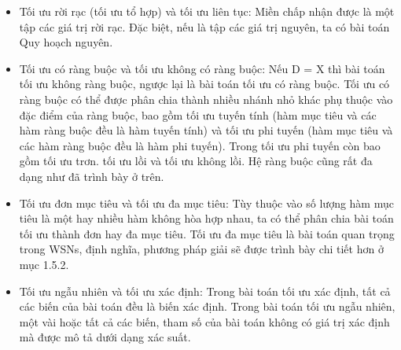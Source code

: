 \documentclass{article}
\begin{document}
\begin{itemize}
    \item Tối ưu rời rạc (tối ưu tổ hợp)  và tối ưu liên tục: Miền chấp nhận được là một tập các giá trị rời rạc. Đặc biệt, nếu là tập các giá trị nguyên, ta có bài toán Quy hoạch nguyên.
    \item Tối ưu có ràng buộc và tối ưu không có ràng buộc: Nếu D = X thì bài toán tối ưu không ràng buộc, ngược lại là bài toán tối ưu có ràng buộc. Tối ưu có ràng buộc có thể được phân chia thành nhiều nhánh nhỏ khác phụ thuộc vào đặc điểm của ràng buộc, bao gồm tối ưu tuyến tính (hàm mục tiêu và  các hàm ràng buộc đều là hàm tuyến tính) và tối ưu phi tuyến  (hàm mục tiêu và  các hàm ràng buộc đều là hàm phi tuyến). Trong tối ưu phi tuyến còn bao gồm tối ưu trơn. tối ưu lồi và tối ưu không lồi. Hệ ràng buộc cũng rất đa dạng như đã trình bày ở trên.
    \item Tối ưu đơn mục tiêu và tối ưu đa mục tiêu: Tùy thuộc vào số lượng hàm mục tiêu là một hay nhiều hàm không hòa hợp nhau, ta có thể  phân chia bài toán tối ưu thành đơn hay đa mục tiêu. Tối ưu đa mục tiêu là bài toán quan trọng trong \gls{WSNs}, định nghĩa, phương pháp giải sẽ được trình bày chi tiết hơn ở mục 1.5.2.
    \item Tối ưu ngẫu nhiên và tối ưu xác định: Trong bài toán tối ưu xác định, tất cả các biến của bài toán đều là biến xác định. Trong bài toán tối ưu ngẫu nhiên, một vài hoặc tất cả các biến, tham số của bài toán không có giá trị xác định mà được mô tả dưới dạng xác suất. 
\end{itemize}
\end{document}
